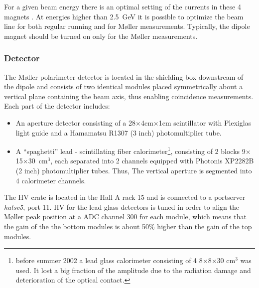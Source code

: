 {For a given beam energy there is an optimal setting of the currents in 
these 4 magnets%
.
At energies higher than 2.5~GeV it is possible
to optimize the beam line for both regular running and for 
M{\o}ller measurements. Typically, the dipole magnet should be turned on
only for the M{\o}ller measurements. 

\subsubsection {Detector}
\label{sec:moller_compon_det}

The M{\o}ller polarimeter detector is located in the shielding box downstream 
of the dipole and consists of two identical modules placed symmetrically about a vertical
plane containing the beam axis, thus enabling   
coincidence measurements.
Each part of the detector includes:
\begin{itemize}
  \item An aperture detector consisting of a 28$\times$4cm$\times$1cm 
        scintillator  with Plexiglas light guide and a Hamamatsu R1307 (3 inch)
        photomultiplier tube.
  \item A ``spaghetti'' lead - scintillating fiber calorimeter\footnote{
         before summer 2002 a lead glass calorimeter consisting of 4 
         8$\times$8$\times$30 cm$^3$
         was used. It lost a big fraction of the amplitude due
         to the radiation damage and deterioration of the optical contact.},
        consisting of 2 blocks 9$\times$15$\times$30~cm$^3$, each separated into 2
        channels equipped with Photonis XP2282B (2 inch) photomultiplier tubes. Thus,
        The vertical aperture is segmented into 4 calorimeter channels.
\end{itemize}
The HV crate is located in the Hall A rack 15 and is connected
to a portserver {\em hatsv5}, port 11.
HV for the lead glass detectors is tuned in order to align the M{\o}ller peak
position at a ADC channel 300 for each module, which means that the gain
of the the bottom modules is about 50\% higher than the gain of the top
modules.

}
